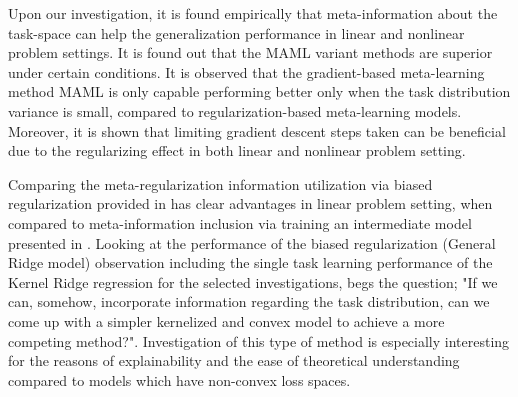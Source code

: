Upon our investigation, it is found empirically that meta-information about the task-space can help the generalization performance in linear and nonlinear problem settings. It is found out that the MAML variant methods are superior under certain conditions. It is observed that the gradient-based meta-learning method MAML is only capable performing better only when the task distribution variance is small, compared to regularization-based meta-learning models. Moreover, it is shown that limiting gradient descent steps taken can be beneficial due to the regularizing effect in both linear and nonlinear problem setting. 

Comparing the meta-regularization information utilization via biased regularization provided in \cite{Denevi2018a} has clear advantages in linear problem setting, when compared to meta-information inclusion via training an intermediate model presented in \cite{Finn2017}. Looking at the performance of the biased regularization (\eg General Ridge model) observation including the single task learning performance of the Kernel Ridge regression for the selected investigations, begs the question; "If we can, somehow, incorporate information regarding the task distribution, can we come up with a simpler kernelized and convex model to achieve a more competing method?". Investigation of this type of method is especially interesting for the reasons of explainability and the ease of theoretical understanding compared to models which have non-convex loss spaces.

